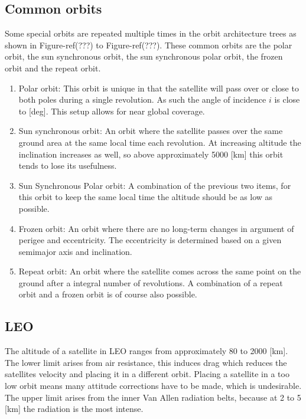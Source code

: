 \subsection {Common orbits}
\label{blOrbCommon}
Some special orbits are repeated multiple times in the orbit architecture trees as shown in Figure-ref(???) to Figure-ref(???). These common orbits are the polar orbit, the sun synchronous orbit, the sun synchronous polar orbit, the frozen orbit and the repeat orbit.

\begin{enumerate}
	\item Polar orbit:
	This orbit is unique in that the satellite will pass over or close to both poles during a single revolution. As such the angle of incidence $i$ is close to   [deg]. This setup allows for near global coverage.
	\item Sun synchronous orbit:
	An orbit where the satellite passes over the same ground area at the same local time each revolution. At increasing altitude the inclination increases as well, so above approximately 5000 [km]\cite{larson} this orbit tends to lose its usefulness. 
	\item Sun Synchronous Polar orbit:
	A combination of the previous two items, for this orbit to keep the same local time the altitude should be as low as possible.
	\item Frozen orbit:
	An orbit where there are no long-term changes in argument of perigee and eccentricity. The eccentricity is determined based on a given semimajor axis and inclination.
	\item Repeat orbit:
	An orbit where the satellite comes across the same point on the ground after a integral number of revolutions. A combination of a repeat orbit and a frozen orbit is of course also possible.
\end{enumerate}

\subsection{\ac{LEO}}
\label{sec:blOrb1}
The altitude of a satellite in \acs{LEO} ranges from approximately 80 to 2000 [km]\cite{nasaOrbit}. The lower limit arises from air resistance, this induces drag which reduces the satellites velocity and placing it in a different orbit. Placing a satellite in a too low orbit means many attitude corrections have to be made, which is undesirable. The upper limit arises from the inner Van Allen radiation belts, because at 2 to 5 [km]\cite{sse} the radiation is the most intense.

